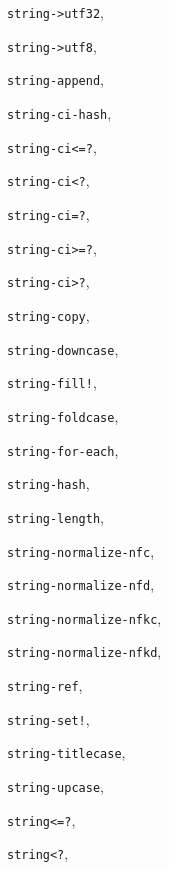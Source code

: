 {\begin{multicols}{2}
\texttt{string-\textgreater{}utf32}, \textit{\pageref{io_s94}}
  
\texttt{string-\textgreater{}utf8}, \textit{\pageref{io_s93}}
  
\texttt{string-append}, \textit{\pageref{objects_s223}}
  
\texttt{string-ci-hash}, \textit{\pageref{objects_s279}}
  
\texttt{string-ci\textless{}=?}, \textit{\pageref{objects_s216}}
  
\texttt{string-ci\textless{}?}, \textit{\pageref{objects_s216}}
  
\texttt{string-ci=?}, \textit{\pageref{objects_s216}}
  
\texttt{string-ci\textgreater{}=?}, \textit{\pageref{objects_s216}}
  
\texttt{string-ci\textgreater{}?}, \textit{\pageref{objects_s216}}
  
\texttt{string-copy}, \textit{\pageref{objects_s222}}
  
\texttt{string-downcase}, \textit{\pageref{objects_s226}}
  
\texttt{string-fill!}, \textit{\pageref{objects_s225}}
  
\texttt{string-foldcase}, \textit{\pageref{objects_s226}}
  
\texttt{string-for-each}, \textit{\pageref{control_s50}}
  
\texttt{string-hash}, \textit{\pageref{objects_s279}}
  
\texttt{string-length}, \textit{\pageref{objects_s219}}
  
\texttt{string-normalize-nfc}, \textit{\pageref{objects_s227}}
  
\texttt{string-normalize-nfd}, \textit{\pageref{objects_s227}}
  
\texttt{string-normalize-nfkc}, \textit{\pageref{objects_s227}}
  
\texttt{string-normalize-nfkd}, \textit{\pageref{objects_s227}}
  
\texttt{string-ref}, \textit{\pageref{objects_s220}}
  
\texttt{string-set!}, \textit{\pageref{objects_s221}}
  
\texttt{string-titlecase}, \textit{\pageref{objects_s226}}
  
\texttt{string-upcase}, \textit{\pageref{objects_s226}}
  
\texttt{string\textless{}=?}, \textit{\pageref{objects_s215}}
  
\texttt{string\textless{}?}, \textit{\pageref{objects_s215}}
  

\end{multicols}}

